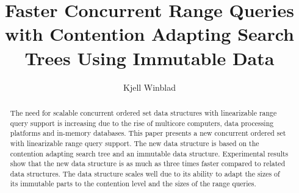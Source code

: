 \documentclass[a4paper,UKenglish]{oasics-v2016}
\title{Faster Concurrent Range Queries with Contention Adapting Search Trees Using Immutable Data}%
\author[1]{Kjell Winblad}
\affil[1]{Department of Information Technology, Uppsala University, Sweden\\
  \texttt{kjell.winblad@it.uu.se}}
\begin{document}
 
\maketitle



\begin{abstract}
  The need for scalable concurrent ordered set data structures with linearizable range query support is increasing due to the rise of multicore computers, data processing platforms and in-memory databases.
  This paper presents a new concurrent ordered set with linearizable range query support.
  The new data structure is based on the contention adapting search tree and an immutable data structure.
  Experimental results show that the new data structure is as much as three times faster compared to related data structures.
  The data structure scales well due to its ability to adapt the sizes of its immutable parts to the contention level and the sizes of the range queries.
\end{abstract} 
\end{document}
